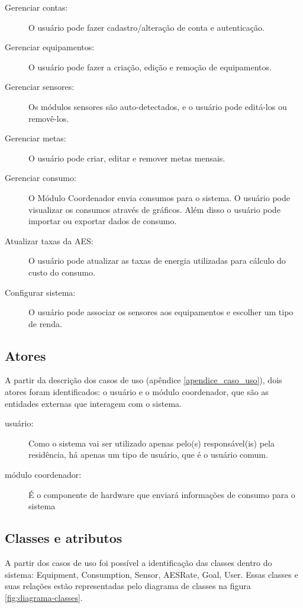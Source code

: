 \begin{description}
	\item[Gerenciar contas:] O usuário pode fazer cadastro/alteração de conta e autenticação.
	\item[Gerenciar equipamentos:] O usuário pode fazer a criação, edição e remoção de equipamentos.
	\item[Gerenciar sensores:] Os módulos sensores são auto-detectados, e o usuário pode editá-los ou removê-los.
	\item[Gerenciar metas:] O usuário pode criar, editar e remover metas mensais.
	\item[Gerenciar consumo:] O Módulo Coordenador envia consumos para o sistema. O usuário pode visualizar os consumos através de gráficos. Além disso o usuário pode importar ou exportar dados de consumo.
	\item[Atualizar taxas da AES:] O usuário pode atualizar as taxas de energia utilizadas para cálculo do custo do consumo.
	\item[Configurar sistema:] O usuário pode associar os sensores aos equipamentos e escolher um tipo de renda.
\end{description}

\subsection{Atores}

A partir da descrição dos casos de uso (apêndice \ref{apendice_caso_uso}), dois atores foram identificados: o usuário e o módulo coordenador, que são as entidades externas que interagem com o sistema.

\begin{description}
	\item[usuário:] Como o sistema vai ser utilizado apenas pelo(s) responsável(is) pela residência, há apenas um tipo de usuário, que é o usuário comum.
    \item[módulo coordenador:] É o componente de hardware que enviará informações de consumo para o sistema
\end{description}

%
\subsection{Classes e atributos}

A partir dos casos de uso foi possível a identificação das classes dentro do sistema: Equipment, Consumption, Sensor, AESRate, Goal, User. Essas classes e suas relações estão representadas pelo diagrama de classes na figura \ref{fig:diagrama-classes}.

